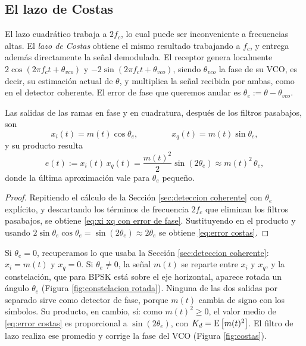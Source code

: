 \subsection{El lazo de Costas}\label{sec:costas}

El lazo cuadrático trabaja a $2f_c$, lo cual puede ser inconveniente a frecuencias altas. El \emph{lazo de Costas} obtiene el mismo resultado trabajando a $f_c$, y entrega además directamente la señal demodulada. El receptor genera localmente $2\cos(2\pi f_c t+\theta_{vco})$ y $-2\sin(2\pi f_c t+\theta_{vco})$, siendo $\theta_{vco}$ la fase de su VCO, es decir, su estimación actual de $\theta$, y multiplica la señal recibida por ambas, como en el detector coherente. El error de fase que queremos anular es $\theta_e:=\theta-\theta_{vco}$.

\begin{proposicion}\label{prop:costas}
Las salidas de las ramas en fase y en cuadratura, después de los filtros pasabajos, son
\begin{equation}\label{eq:xi xq con error de fase}
    x_i(t) = m(t)\cos\theta_e, \qquad\qquad x_q(t) = m(t)\sin\theta_e,
\end{equation}
y su producto resulta
\begin{equation}\label{eq:error costas}
    e(t) := x_i(t)\,x_q(t) = \frac{m(t)^2}{2}\sin(2\theta_e) \approx m(t)^2\,\theta_e,
\end{equation}
donde la última aproximación vale para $\theta_e$ pequeño.
\end{proposicion}
\begin{proof}
Repitiendo el cálculo de la Sección \ref{sec:deteccion coherente} con $\theta_e$ explícito, y descartando los términos de frecuencia $2f_c$ que eliminan los filtros pasabajos, se obtiene \eqref{eq:xi xq con error de fase}. Sustituyendo en el producto y usando $2\sin\theta_e\cos\theta_e=\sin(2\theta_e)\approx 2\theta_e$ se obtiene \eqref{eq:error costas}.
\end{proof}

Si $\theta_e=0$, recuperamos lo que usaba la Sección \ref{sec:deteccion coherente}: $x_i= m(t)$ y $x_q= 0$. Si $\theta_e\neq 0$, la señal $m(t)$ se reparte entre $x_i$ y $x_q$, y la constelación, que para BPSK está sobre el eje horizontal, aparece rotada un ángulo $\theta_e$ (Figura \ref{fig:constelacion rotada}). Ninguna de las dos salidas por separado sirve como detector de fase, porque $m(t)$ cambia de signo con los símbolos. Su producto, en cambio, sí: como $m(t)^2\geqslant 0$, el valor medio de \eqref{eq:error costas} es proporcional a $\sin(2\theta_e)$, con $K_d=\mathrm{E}\left[m(t)^2\right]$. El filtro de lazo realiza ese promedio y corrige la fase del VCO (Figura \ref{fig:costas}).

